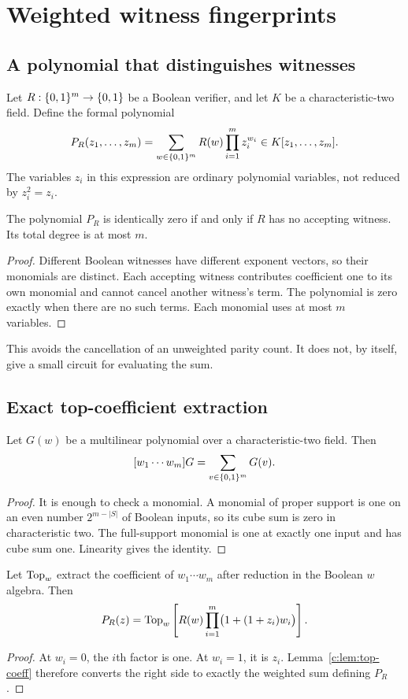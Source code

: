 \chapter{Weighted witness fingerprints}
\label{c:ch:fingerprint}
\section{A polynomial that distinguishes witnesses}
Let $R:\{0,1\}^m\to\{0,1\}$ be a Boolean verifier, and let $K$ be a characteristic-two field. Define the formal polynomial
\[
 P_R(z_1,\ldots,z_m)=
 \sum_{w\in\{0,1\}^m}R(w)\prod_{i=1}^m z_i^{w_i}\in K[z_1,\ldots,z_m].
\]
The variables $z_i$ in this expression are ordinary polynomial variables, not reduced by $z_i^2=z_i$.

\begin{theorem}\label{c:thm:fingerprint}
The polynomial $P_R$ is identically zero if and only if $R$ has no accepting witness. Its total degree is at most $m$.
\end{theorem}
\begin{proof}
Different Boolean witnesses have different exponent vectors, so their monomials are distinct. Each accepting witness contributes coefficient one to its own monomial and cannot cancel another witness's term. The polynomial is zero exactly when there are no such terms. Each monomial uses at most $m$ variables.
\end{proof}
This avoids the cancellation of an unweighted parity count. It does not, by itself, give a small circuit for evaluating the sum.

\section{Exact top-coefficient extraction}
\begin{lemma}\label{c:lem:top-coeff}
Let $G(w)$ be a multilinear polynomial over a characteristic-two field. Then
\[
 [w_1\cdots w_m]G=\sum_{v\in\{0,1\}^m}G(v).
\]
\end{lemma}
\begin{proof}
It is enough to check a monomial. A monomial of proper support is one on an even number $2^{m-|S|}$ of Boolean inputs, so its cube sum is zero in characteristic two. The full-support monomial is one at exactly one input and has cube sum one. Linearity gives the identity.
\end{proof}

\begin{theorem}\label{c:thm:weighted-top}
Let $\operatorname{Top}_w$ extract the coefficient of $w_1\cdots w_m$ after reduction in the Boolean $w$ algebra. Then
\begin{equation}\label{c:eq:weighted-top}
 P_R(z)=\operatorname{Top}_w\left[
 R(w)\prod_{i=1}^m\bigl(1+(1+z_i)w_i\bigr)
 \right].
\end{equation}
\end{theorem}
\begin{proof}
At $w_i=0$, the $i$th factor is one. At $w_i=1$, it is $z_i$. Lemma~\ref{c:lem:top-coeff} therefore converts the right side to exactly the weighted sum defining $P_R$.
\end{proof}


